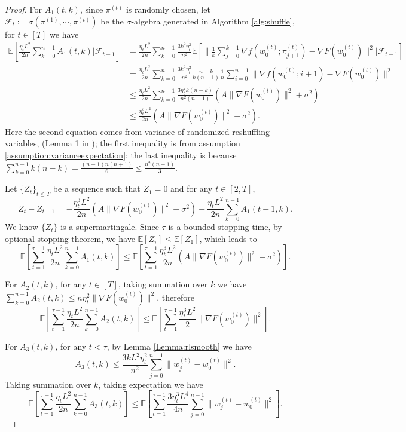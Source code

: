 \documentclass{article} %
\theoremstyle{plain}
\theoremstyle{definition}
\theoremstyle{remark}
\begin{document}
\begin{proof}
    For $A_1(t, k)$, since $\pi^{(t)}$ is randomly chosen, let $\mathcal{F}_t:=\sigma(\pi^{(1)},\cdots,\pi^{(t)})$ be the $\sigma$-algebra generated in Algorithm \ref{alg:shuffle}, for $t\in[T]$ we have 
    \begin{align*}
        \mathbb{E}[\frac{\eta_t L^2}{2n}\sum_{k=0}^{n-1}A_1(t, k)|\mathcal{F}_{t-1}] &= \frac{\eta_t L^2}{2n}\sum_{k=0}^{n-1}\frac{3k^2\eta_t^2}{n^2} \mathbb{E}[\|\frac{1}{k}\sum_{j=0}^{k-1}\nabla f(w^{(t)}_0;\pi^{(t)}_{j+1})-\nabla F(w^{(t)}_0)\|^2|\mathcal{F}_{t-1}] \\
        &= \frac{\eta_t L^2}{2n}\sum_{k=0}^{n-1}\frac{3k^2\eta_t^2}{n^2}\frac{n-k}{k(n-1)}\frac{1}{n}\sum_{i=0}^{n-1}\|\nabla f(w^{(t)}_0;i+1)-\nabla F(w^{(t)}_0)\|^2 \\
        &\leq \frac{\eta_t L^2}{2n}\sum_{k=0}^{n-1} \frac{3\eta_t^2 k(n-k)}{n^2(n-1)}(A\|\nabla F(w^{(t)}_0)\|^2+\sigma^2)\\
        &\leq \frac{\eta_t^3 L^2}{2n}(A\|\nabla F(w^{(t)}_0)\|^2+\sigma^2).
    \end{align*} 
    Here the second equation comes from variance of randomized reshuffling variables, (Lemma 1 in \citet{mishchenko2020random}); the first inequality is from assumption \ref{assumption:varianceexpectation}; the last inequality is because $\sum_{k=0}^{n-1} k(n-k)=\frac{(n-1)n(n+1)}{6}\leq \frac{n^2(n-1)}{3}$.
     
    Let $\{Z_t\}_{t\leq T}$ be a sequence such that $Z_1=0$ and for any $t\in[2,T]$, $$Z_{t}-Z_{t-1} = -\frac{\eta_t^3 L^2}{2n}(A\|\nabla F(w^{(t)}_0)\|^2+\sigma^2)+\frac{\eta_t L^2}{2n}\sum_{k=0}^{n-1}A_1(t-1,k).$$ We know $\{Z_t\}$ is a supermartingale. Since $\tau$ is a bounded stopping time, by optional stopping theorem, we have $\mathbb{E}[Z_{\tau}]\leq \mathbb{E}[Z_1]$, which leads to 
    $$\mathbb{E}[\sum_{t=1}^{\tau-1}\frac{\eta_t L^2}{2n}\sum_{k=0}^{n-1}A_1(t,k)]\leq \mathbb{E}[\sum_{t=1}^{\tau-1} \frac{\eta_t^3 L^2}{2n}(A\|\nabla F(w^{(t)}_0)\|^2+\sigma^2)].$$

    For $A_2(t,k)$, for any $t\in[T]$, taking summation over $k$ we have $\sum_{k=0}^{n-1}A_2(t,k)\leq n\eta_t^2\|\nabla F(w^{(t)}_0)\|^2$, therefore 
    $$\mathbb{E}[\sum_{t=1}^{\tau-1}\frac{\eta_t L^2}{2n}\sum_{k=0}^{n-1}A_2(t,k)]\leq \mathbb{E}[\sum_{t=1}^{\tau-1}\frac{\eta_t^3 L^2}{2}\|\nabla F(w^{(t)}_0)\|^2].$$

    For $A_3(t,k)$, for any $t<\tau$, by Lemma \ref{Lemma:rlsmooth} we have $$A_3(t,k)\leq \frac{3kL^2\eta_t^2}{n^2}\sum_{j=0}^{n-1}\|w^{(t)}_j-w^{(t)}_0\|^2.$$ Taking summation over $k$, taking expectation we have
    $$\mathbb{E}[\sum_{t=1}^{\tau-1}\frac{\eta_t L^2}{2n}\sum_{k=0}^{n-1}A_3(t,k)]\leq \mathbb{E}[\sum_{t=1}^{\tau-1}\frac{3\eta_t^3 L^4}{4n}\sum_{j=0}^{n-1}\|w^{(t)}_j-w^{(t)}_0\|^2].$$


\end{proof}
\end{document}
